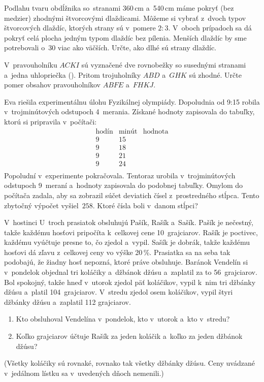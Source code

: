 {%
Podlahu tvaru obdĺžnika so~stranami 360\,cm a~540\,cm máme pokryť (bez medzier)
zhodnými štvorcovými dlaždicami. Môžeme si vybrať z~dvoch typov
štvorcových dlaždíc, ktorých strany sú v~pomere $2:3$.
V~oboch prípadoch sa dá pokryť celá plocha jedným typom dlaždíc bez pílenia.
Menších dlaždíc by sme potrebovali o~30 viac ako väčších.
Určte, ako dlhé sú strany dlaždíc.}

{%
V~pravouholníku $ACKI$ sú vyznačené dve rovnobežky so susednými
stranami a~jedna uhlopriečka (\obr).
Pritom trojuholníky $ABD$ a~$GHK$ sú zhodné.
Určte pomer obsahov pravouholníkov $ABFE$ a~$FHKJ$.
%
}

{%
Eva riešila experimentálnu úlohu Fyzikálnej olympiády.
Dopoludnia od 9:15 robila v~trojminútových odstupoch 4~merania.
Získané hodnoty zapisovala do tabuľky, ktorú si pripravila v~počítači:
$$
\begin{array}{c|c|c}
\text{hodín} & \text{minút} & \text{hodnota} \\
\hline
9 & 15 & \\
9 & 18 & \\
9 & 21 & \\
9 & 24 & \\
\end{array}
$$
Popoludní v~experimente pokračovala.
Tentoraz urobila v~trojminútových odstupoch 9~meraní a~hodnoty zapisovala
do podobnej tabuľky.
Omylom do počítača zadala, aby sa zobrazil súčet deviatich čísel
z~prostredného stĺpca.
Tento zbytočný výpočet vyšiel~$258$.
Ktoré čísla boli v~danom stĺpci?
}

{%
V~hostinci U~troch prasiatok obsluhujú Pašík, Rašík a~Sašík.
Pašík je nečestný, takže každému hosťovi pripočíta
k~celkovej cene 10~grajciarov.
Rašík je poctivec, každému vyúčtuje presne to, čo zjedol a~vypil.
Sašík je dobrák, takže každému hosťovi dá zľavu z~celkovej ceny vo výške
20\,\%.
Prasiatka sa na seba tak podobajú, že žiadny hosť nepozná, ktoré práve obsluhuje.
Baránok Vendelín si v~pondelok objednal tri koláčiky a~džbánok džúsu
a~zaplatil za to 56~grajciarov.
Bol spokojný, takže hneď v~utorok zjedol päť koláčikov, vypil k~nim tri džbánky
džúsu a~platil 104~grajciarov.
V~stredu zjedol osem koláčikov, vypil štyri džbánky
džúsu a~zaplatil 112 grajciarov.
\begin{enumerate}
\item Kto obsluhoval Vendelína v~pondelok, kto v~utorok a~kto v~stredu?
\item Koľko grajciarov účtuje Rašík za jeden koláčik a~koľko za jeden
džbánok džúsu?
\end{enumerate}
(Všetky koláčiky sú rovnaké, rovnako tak všetky džbánky džúsu.
Ceny uvádzané v~jedálnom lístku sa v~uvedených dňoch nemenili.)
}


